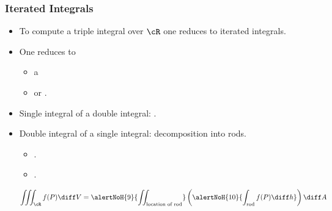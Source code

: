 \begin{frame}
\frametitle{Iterated Integrals}
\begin{itemize}
\item To compute a triple integral over $\cR$ one reduces to iterated integrals.
\item<2-> One reduces to
\begin{itemize}
\item<2-> a 
\item<3-> or .
\end{itemize}
\item<4-> Single integral of a double integral: .
\item<8-> Double integral of a single integral: decomposition into rods.
\begin{itemize}
\item{}.
\item{}.
\end{itemize}
\[
\iiint_{\cR}f(P) \diff V = \alertNoH{9}{\iint_{\text{location of rod}}}  \left( \alertNoH{10}{\int_{\text{rod}} f(P)  \diff h} \right)  \diff A
\]
\end{itemize}
\end{frame}

